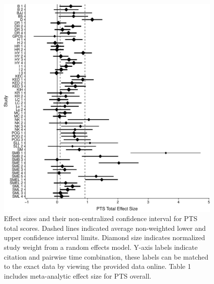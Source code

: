 \documentclass[,man]{apa6}
\begin{document}
\begin{figure}
\centering
\includegraphics{meta_markdown_files/figure-latex/ptspicoverall-1.pdf}
\caption{\label{fig:ptspicoverall}Effect sizes and their non-centralized confidence interval for PTS total scores. Dashed lines indicated average non-weighted lower and upper confidence interval limits. Diamond size indicates normalized study weight from a random effects model. Y-axis labels indicate citation and pairwise time combination, these labels can be matched to the exact data by viewing the provided data online. Table 1 includes meta-analytic effect size for PTS overall.}
\end{figure}
\end{document}
